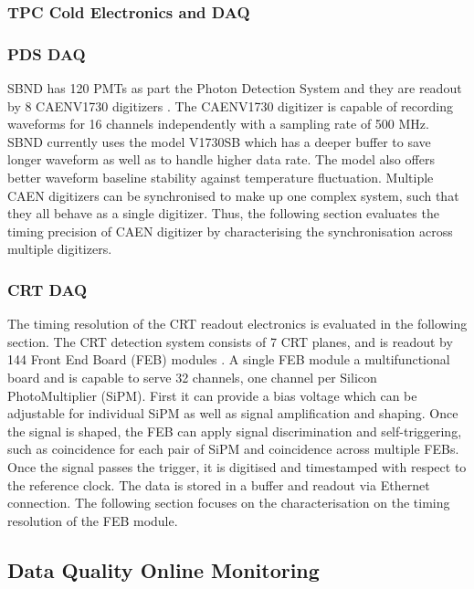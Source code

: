 \subsubsection{TPC Cold Electronics and DAQ}




\subsubsection{PDS DAQ}

SBND has 120 PMTs as part the Photon Detection System and they are readout by 8 CAENV1730 digitizers \cite{caen_manuals}.
The CAENV1730 digitizer is capable of recording waveforms for 16 channels independently with a sampling rate of 500 MHz.
SBND currently uses the model V1730SB which has a deeper buffer to save longer waveform as well as to handle higher data rate.
The model also offers better waveform baseline stability against temperature fluctuation.
Multiple CAEN digitizers can be synchronised to make up one complex system, such that they all behave as a single digitizer.
Thus, the following section evaluates the timing precision of CAEN digitizer by characterising the synchronisation across multiple digitizers.

\subsubsection{CRT DAQ}
The timing resolution of the CRT readout electronics is evaluated in the following section.
The CRT detection system consists of 7 CRT planes, and is readout by 144 Front End Board (FEB) modules \cite{crt_note}. 
A single FEB module a multifunctional board and is capable to serve 32 channels, one channel per Silicon PhotoMultiplier (SiPM). 
First it can provide a bias voltage which can be adjustable for individual SiPM as well as signal amplification and shaping.
Once the signal is shaped, the FEB can apply signal discrimination and self-triggering, such as coincidence for each pair of SiPM and coincidence across multiple FEBs.
Once the signal passes the trigger, it is digitised and timestamped with respect to the reference clock.
The data is stored in a buffer and readout via Ethernet connection.
The following section focuses on the characterisation on the timing resolution of the FEB module.

\subsection{Data Quality Online Monitoring}

